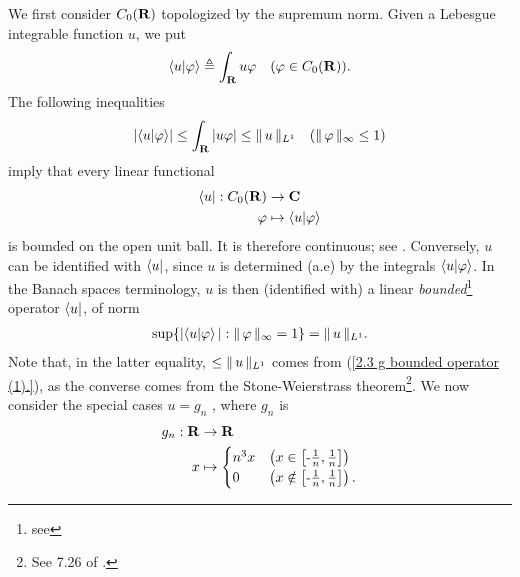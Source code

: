 We first consider %
%
  $C_0(\R)$ %
%
topologized by the supremum norm. %
Given a Lebesgue integrable function $u$, we put %
  \begin{align}
    \bra{u}\ket{\phi} 
      \Def 
    \int_\R u\phi  
      \quad(\phi \in C_0(\R)).
  \end{align}
%
The following inequalities %
%
  \begin{align}\label{2.3  g  bounded operator (1).}
    \left\lvert\bra{u}\ket{\phi}\right\rvert 
      \leq 
    \int_\R \left\lvert u\phi \right\rvert 
      \leq
    \norm{L^1}{u}
      \quad(\norm{\infty}{\phi} \leq 1)
  \end{align} 
%
imply that every linear functional 
%
  \begin{align}
    \bra{u}: C_0(\R) &\to \C \\
             \phi    &\mapsto \bra{u}\ket{\phi} \nonumber
  \end{align}
is bounded on the open unit ball. It is therefore continuous; %
%
  see . %
%
Conversely, ${u}$ can be identified with %
%
  $\bra{u}$, %
%
since $u$ is determined (a.e) by the integrals %
%
  $\bra{u}\ket{\phi}$. %
%
In the Banach spaces terminology, 
% 
  $u$ is then (identified with) a linear \textit{bounded}\hspace{2pt}\footnote{
    see 
  } %
operator $\bra{u}$, of norm %
%
  \begin{align}\label{2.3  g  bounded operator (2).}
    \sup\set{
      \magnitude{\bra{u}\ket{\phi}}
    }{ 
      \norm{\infty}{\phi} = 1
    } 
    =  \norm{L^1}{u}.
  \end{align} 
%
Note that, in the latter equality, $\leq \norm{L^1}{u}$ comes from %
%
  (\ref{2.3  g  bounded operator (1).}), %
%
as the converse comes from the Stone-Weierstrass theorem\footnote{
%
  See 7.26 of \cite{BabyRudin}.
}. %
%
We now consider the special cases %
%
  $u = g_n$ %
%
, where $g_n$ is %
%
  \begin{align}
    g_n : \R & \to \R\\
           x & \mapsto \begin{cases} 
  n^3 x & \left(x \in    \left[\minus \frac{1}{n}, \frac{1}{n}\right]\right)\\
  0     & \left(x \notin \left[\minus \frac{1}{n}, \frac{1}{n}\right]\right).
  \end{cases}\nonumber
  \end{align}
